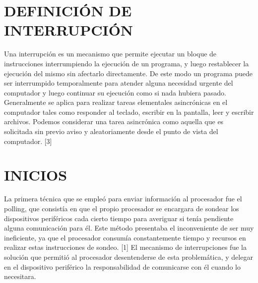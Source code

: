 \documentclass{article}
\begin{document}
\section{DEFINICIÓN DE INTERRUPCIÓN}

Una interrupción es un mecanismo que permite ejecutar un bloque de instrucciones interrumpiendo la ejecución de un programa, y luego restablecer la ejecución del mismo sin afectarlo directamente. De este modo un programa puede ser interrumpido temporalmente para atender alguna necesidad urgente del computador y luego continuar su ejecución como si nada hubiera pasado.
Generalmente se aplica para realizar tareas elementales asincrónicas en el computador tales como responder al teclado, escribir en la pantalla, leer y escribir archivos. Podemos considerar una tarea asincrónica como aquella que es solicitada sin previo aviso y aleatoriamente desde el punto de vista del computador.  [3]

\section{INICIOS}

La primera técnica que se empleó para enviar información al procesador  fue el polling, que consistía en que el propio procesador se encargara de sondear los dispositivos periféricos cada cierto tiempo para averiguar si tenía pendiente alguna comunicación para él. Este método presentaba el inconveniente de ser muy ineficiente, ya que el procesador consumía constantemente tiempo y recursos en realizar estas instrucciones de sondeo. [1]
El mecanismo de interrupciones fue la solución que permitió al procesador desentenderse de esta problemática, y delegar en el dispositivo periférico la responsabilidad de comunicarse con él cuando lo necesitara.
\end{document}

